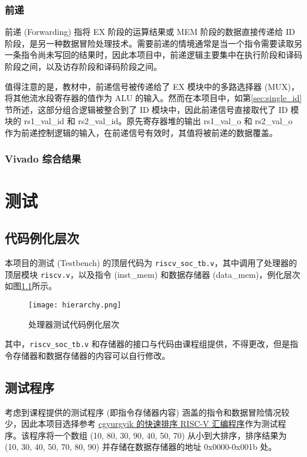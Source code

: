 \documentclass[lang=zh]{sjtureport}
\begin{document}
\subsection{前递}

前递 (Forwarding) 指将 EX 阶段的运算结果或 MEM 阶段的数据直接传递给 ID 阶段，是另一种数据冒险处理技术。需要前递的情境通常是当一个指令需要读取另一条指令尚未写回的结果时，因此本项目中，前递逻辑主要集中在执行阶段和译码阶段之间，以及访存阶段和译码阶段之间。

值得注意的是，教材\cite{COD}中，前递信号被传递给了 EX 模块中的多路选择器 (MUX)，将其他流水段寄存器的值作为 ALU 的输入。然而在本项目中，如第\ref{sec:single_id}节所述，这部分组合逻辑被整合到了 ID 模块中，因此前递信号直接取代了 ID 模块的 rs1\_val\_id 和 rs2\_val\_id。原先寄存器堆的输出 rs1\_val\_o 和 rs2\_val\_o 作为前递控制逻辑的输入，在前递信号有效时，其值将被前递的数据覆盖。

\subsection{Vivado 综合结果}

\chapter{测试}

\section{代码例化层次}

本项目的测试 (Testbench) 的顶层代码为 \texttt{riscv\_soc\_tb.v}，其中调用了处理器的顶层模块 \texttt{riscv.v}，以及指令 (inst\_mem) 和数据存储器 (data\_mem)，例化层次如图\ref{fig:hierarchy}所示。

\begin{figure}[!htp]
	\centering
	\texttt{[image: hierarchy.png]}
	\caption{处理器测试代码例化层次}
	\label{fig:hierarchy}
\end{figure}

其中，\texttt{riscv\_soc\_tb.v} 和存储器的接口与代码由课程组提供，不得更改，但是指令存储器和数据存储器的内容可以自行修改。

\section{测试程序}

考虑到课程提供的测试程序 (即指令存储器内容) 涵盖的指令和数据冒险情况较少，因此本项目选择参考 \href{https://github.com/cgyurgyik/riscv-assembly/blob/master/quicksort.s}{cgyurgyik 的快速排序 RISC-V 汇编程序}作为测试程序。该程序将一个数组 (10, 80, 30, 90, 40, 50, 70) 从小到大排序，排序结果为 (10, 30, 40, 50, 70, 80, 90) 并存储在数据存储器的地址 0x0000-0x001b 处。
\end{document}
